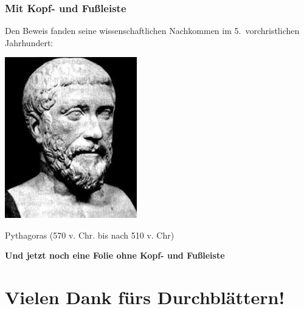 \documentclass[t]{beamer}
\begin{document}
\begin{frame}
\frametitle{Mit Kopf- und Fußleiste}

Den Beweis fanden seine wissenschaftlichen Nachkommen
im 5.~vorchristlichen Jahrhundert:\pause

\bigskip

\includegraphics[height=7cm]{pythagoras.jpg}

Pythagoras (570 v. Chr. bis nach 510 v. Chr)\pause

\textbf{Und jetzt noch eine Folie ohne Kopf- und Fußleiste}

\end{frame}


\section{Vielen Dank fürs Durchblättern!}
\end{document}
